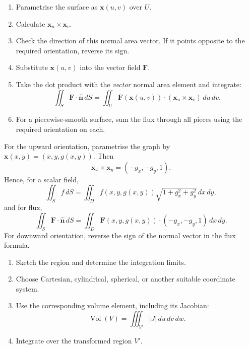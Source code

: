 \begin{nmeth}
  \begin{enumerate}\emph{}

    \item Parametrise the surface as $\mathbf{x}(u,v)$ over $U$.
    \item Calculate $\mathbf{x}_u\times\mathbf{x}_v$.
    \item Check the direction of this normal area vector. If it points opposite to the required orientation, reverse its sign.
    \item Substitute $\mathbf{x}(u,v)$ into the vector field $\mathbf{F}$.
    \item Take the dot product with the \emph{vector} normal area element and integrate:
    \[
      \iint_S \mathbf{F}\cdot\hat{\mathbf{n}}\,dS
      =\iint_U \mathbf{F}(\mathbf{x}(u,v))
      \cdot(\mathbf{x}_u\times\mathbf{x}_v)\,du\,dv.
    \]
    \item For a piecewise-smooth surface, sum the flux through all pieces using the required orientation on each.
  \end{enumerate}
\end{nmeth}

\begin{nmeth}[Surface Given as a Graph $z=g(x,y)$]
  For the upward orientation, parametrise the graph by
  $\mathbf{x}(x,y)=(x,y,g(x,y))$. Then
  \[
    \mathbf{x}_x\times\mathbf{x}_y=(-g_x,-g_y,1).
  \]
  Hence, for a scalar field,
  \[
    \iint_S f\,dS
    =\iint_D f(x,y,g(x,y))
    \sqrt{1+g_x^2+g_y^2}\,dx\,dy,
  \]
  and for flux,
  \[
    \iint_S \mathbf{F}\cdot\hat{\mathbf{n}}\,dS
    =\iint_D \mathbf{F}(x,y,g(x,y))
    \cdot(-g_x,-g_y,1)\,dx\,dy.
  \]
  For downward orientation, reverse the sign of the normal vector in the flux formula.
\end{nmeth}

\begin{nmeth}
  \begin{enumerate}\emph{}

    \item Sketch the region and determine the integration limits.
    \item Choose Cartesian, cylindrical, spherical, or another suitable coordinate system.
    \item Use the corresponding volume element, including its Jacobian:
    \[
      \operatorname{Vol}(V)=\iiint_{V'} |J|\,du\,dv\,dw.
    \]
    \item Integrate over the transformed region $V'$.
  \end{enumerate}
\end{nmeth}


